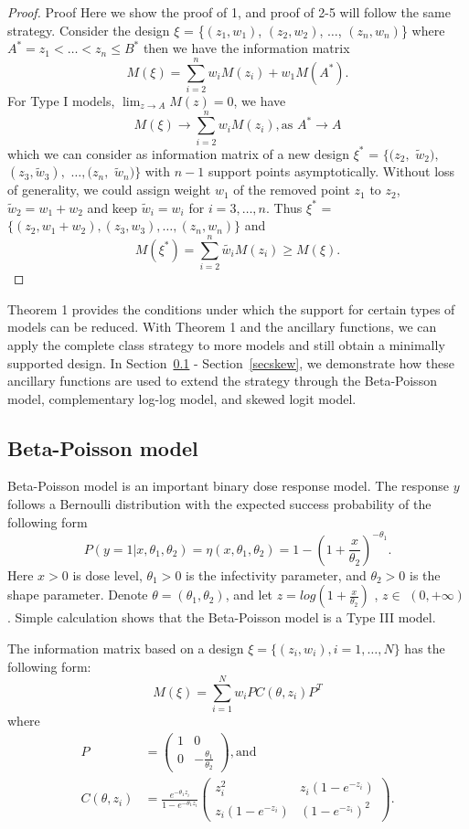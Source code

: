 \documentclass[12pt]{TD-CJS}
\begin{document}
\begin{proof}{Proof}{}
Here we show the proof of 1, and proof of 2-5 will follow the same strategy. Consider the design $\xi$ = \{$(z_1,w_1)$, $(z_2,w_2)$, $\ldots$, $(z_n,w_n)$\} where $A^* = z_1< \ldots< z_n \le B^*$ then we have the information matrix \[M(\xi) =\sum_{i=2}^{n} w_iM(z_i)+w_1M(A^*). \] 
For Type I models,  $\lim_{z\to A}M(z)=0$, we have 
\[
M(\xi) \to\sum_{i=2}^{n} w_iM(z_i),  \text{as } A^* \to A\] which we can consider as information matrix of a new design $\xi^*$ =  $\{(z_2, $ $\tilde{w}_2),$ $ (z_3, \tilde{w}_3),$ $\ldots,(z_{n},$ $\tilde{w}_n) \}$ with $n-1$ support points asymptotically. Without loss of generality, we could assign weight $w_1$ of the removed point $z_1$ to $z_2$, $\tilde{w}_2 = w_1+w_2$ and keep $\tilde{w}_i = w_i$ for $i=3,\ldots,n$. Thus $\xi^*$ =  $\{(z_2, w_1+w_2), (z_3, w_3),\ldots,(z_{n},w_n) \}$ and\[ M(\xi^*) =  \sum_{i=2}^{n} \tilde{w_i}M(z_i)\ge M(\xi).\]

\end{proof}

Theorem 1 provides the conditions under which the support for certain types of models can be reduced. With Theorem 1 and the ancillary functions, we can apply the complete class strategy to more models and still obtain a minimally supported design. In Section~\ref{secbeta} - Section~\ref{secskew}, we demonstrate how these ancillary functions are used to extend the strategy through the Beta-Poisson model, complementary log-log model, and skewed logit model.

 





\subsection{Beta-Poisson model}\label{secbeta}
Beta-Poisson model is an important binary dose response model. The response $y$ follows a Bernoulli distribution with the expected success probability of the following form
\[
P(y=1|x,\theta_1,\theta_2) = \eta(x,\theta_1,\theta_2)= 1-(1+\frac{x}{\theta_2})^{-\theta_1}.
\]
 Here $x> 0$ is dose level, $\theta_1>0$ is the infectivity parameter, and $\theta_2>0$ is the shape parameter. Denote $\theta = (\theta_1,\theta_2)$, and let $z = log(1+\frac{x}{\theta_2})$ , $z\in$ $(0,+\infty)$. Simple calculation shows that the Beta-Poisson model is a Type III model. 
 
 The information matrix based on a design $\xi = \{(z_i,w_i), i=1,\ldots,N\}$ has the following form: \[
M(\xi) = \sum_{i=1}^{N} w_iP C(\theta,z_i)P^T 
\] where \begin{align*}
    P &= \left( \begin{array}{cc}
1 & 0\\
0 & -\frac{\theta_1}{\theta_2}
\end{array} \right), \text{and}\\ 
C(\theta,z_i) &= \frac{e^{-\theta_1z_i}}{1-e^{-\theta_1z_i}}\left( \begin{array}{cc}
z_i^2 & z_i(1-e^{-z_i})\\
z_i(1-e^{-z_i}) & (1-e^{-z_i})^2
\end{array} \right).
\end{align*} 
\end{document}
